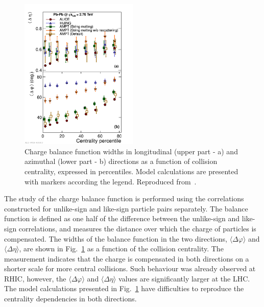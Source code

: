 \begin{figure}
\centering
\includegraphics[width=0.5\textwidth]{ksfigures/BalanceFunctionWidth.pdf}
\caption{Charge balance function widths in longitudinal (upper part - a) and azimuthal (lower part - b) directions as a function of collision centrality, expressed in percentiles. Model calculations are presented with markers according the legend. Reproduced from~\cite{}.}
\label{figks:Balance}
\end{figure}

The study of the charge balance function is performed using the correlations constructed for unlike-sign and like-sign particle pairs separately. The balance function is defined as one half of the difference between the unlike-sign and like-sign correlations, and measures the distance over which the charge of particles is compensated. The widths of the balance function in the two directions, $\langle \Delta\varphi \rangle$ and $\langle \Delta\eta \rangle$, are shown in Fig.~\ref{figks:Balance} as a function of the collision centrality. The measurement indicates that the charge is compensated in both directions on a shorter scale for more central collisions. Such behaviour was already observed at RHIC, however, the $\langle \Delta\varphi \rangle$ and $\langle \Delta\eta \rangle$ values are significantly larger at the LHC. The model calculations presented in Fig.~\ref{figks:Balance} have difficulties to reproduce the centrality dependencies in both directions.


